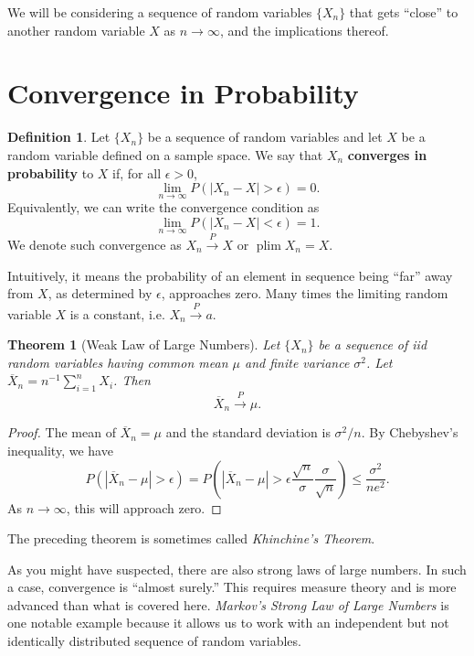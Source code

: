 \documentclass[12pt]{article}
\newcommand{\sumn}{\sum_{i=1}^n}
\newcommand{\xbar}{\overline{X}}
\newcommand{\cprob}{\overset{P}{\rightarrow}}
\DeclareMathOperator*{\plim}{plim}
\newtheorem{theorem}{Theorem}
\theoremstyle{definition}
\newtheorem{definition}{Definition}
\begin{document}
\maketitle
\onehalfspace


\noindent We will be considering a sequence of random variables $\{X_n\}$ that gets ``close'' to another random variable $X$ as $n \rightarrow \infty$, and the implications thereof.




\section{Convergence in Probability}

\begin{definition}
	Let $\{X_n\}$ be a sequence of random variables and let $X$ be a random variable defined on a sample space. We say that $X_n$ \textbf{converges in probability} to $X$ if, for all $\epsilon > 0$, 
	\[\lim_{n \rightarrow \infty} P(|X_n - X| > \epsilon) =0.	\]
Equivalently, we can write the convergence condition as 
	\[\lim_{n \rightarrow \infty} P(|X_n - X| < \epsilon) =1.	\]
We denote such convergence as $X_n \cprob X$ or $\plim X_n = X$. 
\end{definition} 

Intuitively, it means the probability of an element in sequence being ``far'' away from $X$, as determined by $\epsilon$, approaches zero. Many times the limiting random variable $X$ is a constant, i.e. $X_n \cprob a$. 

\begin{theorem}[Weak Law of Large Numbers] 
	Let $\{X_n\}$ be a sequence of iid random variables having common mean $\mu$ and finite variance $\sigma^2$. Let $\xbar_n = n^{-1}\sumn X_i$. Then
		\[\xbar_n \cprob \mu.	\]
\end{theorem}
\begin{proof}
	The mean of $\xbar_n=\mu$ and the standard deviation is $\sigma^2/n$. By Chebyshev's inequality, we have
		\[P(| \xbar_n - \mu| > \epsilon)  = P\left(\left \vert \xbar_n - \mu \right\vert > \epsilon \frac{\sqrt{n}}{\sigma} \frac{\sigma}{\sqrt{n}}\right)   \leq \frac{\sigma^2}{ne^2}.\]
As $n\rightarrow \infty$, this will approach zero. 
\end{proof}
The preceding theorem is sometimes called \emph{Khinchine's Theorem}.

As you might have suspected, there are also strong laws of large numbers.  In such a case, convergence is ``almost surely.'' This requires measure theory and is more advanced than what is covered here. \emph{Markov's Strong Law of Large Numbers} is one notable example because it allows us to work with an independent but not identically distributed sequence of random variables. 
\end{document}

